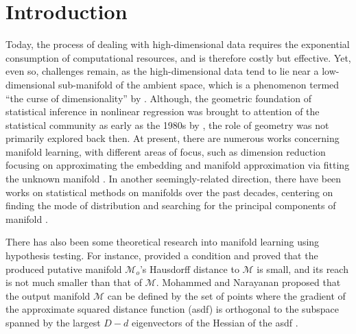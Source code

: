 \documentclass[aos,preprint]{imsart}
\theoremstyle{remark}
\begin{document}

\section{Introduction}

Today, the process of dealing with high-dimensional data requires the exponential consumption of computational resources, and is therefore costly but effective. Yet, even so, challenges remain, as the high-dimensional data tend to lie near a low-dimensional sub-manifold of the ambient space, which is a phenomenon termed ``the curse of dimensionality'' by \cite{fefferman2018fitting}.  Although, the geometric foundation of statistical inference in nonlinear regression was brought to attention of the statistical community as early as the 1980s by \cite{Kass1989}, the role of geometry was not primarily explored back then. At present, there are numerous works concerning manifold learning, with different areas of focus, such as dimension reduction focusing on approximating the embedding \citep{roweis2000nonlinear,zhang2004principal,donoho2003hessian,zha2007} and manifold approximation via fitting the unknown manifold \citep{genovese2012manifold,chen2015asymptotic,genovese2014nonparametric}. In another seemingly-related direction, there have been works on statistical methods on manifolds over the past decades, centering on finding the mode of distribution \citep{huckemann2010intrinsic,chen2016nonparametric,chen2016comprehensive} and searching for the principal components of manifold \citep{hauberg2015principal,huckemann2006principal,hastie1989principal}.

There has also been some theoretical research into manifold learning using hypothesis testing. For instance, \cite{fefferman2018fitting} provided a condition and proved that the produced putative manifold ${\mathcal M}_o$'s Hausdorff distance to $\mathcal M$ is small, and its reach is not much smaller than that of $\mathcal M$. Mohammed and Narayanan proposed that the output manifold $\mathcal M$ can be defined by the set of points where the gradient of the approximate squared distance function (asdf) is orthogonal to the subspace spanned by the largest $D-d$ eigenvectors of the Hessian of the asdf \citep{mohammed2017manifold}.

\end{document}

